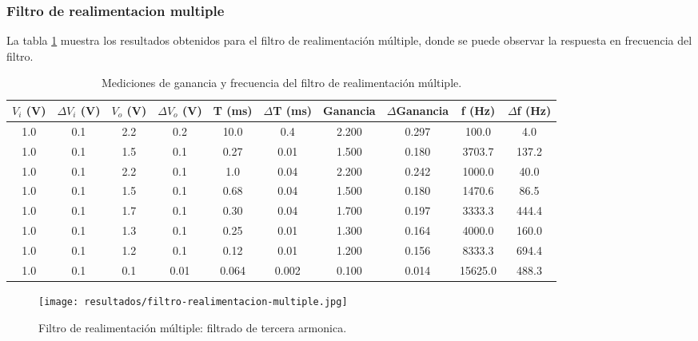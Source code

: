 \subsubsection{Filtro de realimentacion multiple}

La tabla \ref{tab:filtro-realimentacion-multiple-ganancia-frecuencia} muestra los resultados obtenidos para el filtro de realimentación múltiple, donde se puede observar la respuesta en frecuencia del filtro.

\begin{table}[h!]
    \centering
    \begin{tabular}{|c|c|c|c|c|c|c|c|c|c|}
        \hline
        $V_i$ (V) & $\Delta V_i$ (V) & $V_o$ (V) & $\Delta V_o$ (V) & T (ms) & $\Delta$T (ms) & Ganancia & $\Delta$Ganancia & f (Hz) & $\Delta$f (Hz) \\
        \hline
        1.0 & 0.1 & 2.2 & 0.2 & 10.0 & 0.4 & 2.200 & 0.297 & 100.0 & 4.0 \\
        1.0 & 0.1 & 1.5 & 0.1 & 0.27 & 0.01 & 1.500 & 0.180 & 3703.7 & 137.2 \\
        1.0 & 0.1 & 2.2 & 0.1 & 1.0 & 0.04 & 2.200 & 0.242 & 1000.0 & 40.0 \\
        1.0 & 0.1 & 1.5 & 0.1 & 0.68 & 0.04 & 1.500 & 0.180 & 1470.6 & 86.5 \\
        1.0 & 0.1 & 1.7 & 0.1 & 0.30 & 0.04 & 1.700 & 0.197 & 3333.3 & 444.4 \\
        1.0 & 0.1 & 1.3 & 0.1 & 0.25 & 0.01 & 1.300 & 0.164 & 4000.0 & 160.0 \\
        1.0 & 0.1 & 1.2 & 0.1 & 0.12 & 0.01 & 1.200 & 0.156 & 8333.3 & 694.4 \\
        1.0 & 0.1 & 0.1 & 0.01 & 0.064 & 0.002 & 0.100 & 0.014 & 15625.0 & 488.3 \\
        \hline
    \end{tabular}
    \caption{Mediciones de ganancia y frecuencia del filtro de realimentación múltiple.}
    \label{tab:filtro-realimentacion-multiple-ganancia-frecuencia}
\end{table}


\begin{figure}[ht]
    \centering
    \texttt{[image: resultados/filtro-realimentacion-multiple.jpg]}
    \caption{Filtro de realimentación múltiple: filtrado de tercera armonica.}
    \label{fig:filtro-realimentacion-multiple-tercera-armonica}
\end{figure}